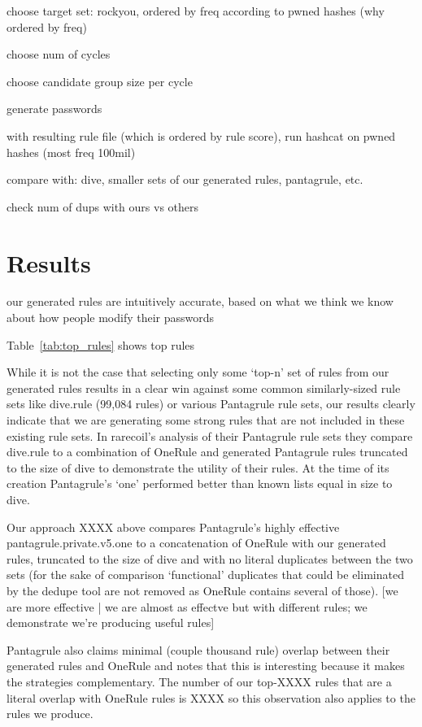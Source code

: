 \documentclass[letterpaper,twocolumn,10pt]{article}
\begin{document}
choose target set: rockyou, ordered by freq according to pwned hashes (why
ordered by freq)

choose num of cycles

choose candidate group size per cycle

generate passwords

with resulting rule file (which is ordered by rule score), run hashcat on pwned
hashes (most freq 100mil)

compare with: dive, smaller sets of our generated rules, pantagrule, etc.

check num of dups with ours vs others

\section{Results}

our generated rules are intuitively accurate, based on what we think we know
about how people modify their passwords

Table~\ref{tab:top_rules} shows top rules

While it is not the case that selecting only some `top-n' set of rules from our
generated rules results in a clear win against some common similarly-sized rule sets
like dive.rule (99,084 rules) or various Pantagrule rule sets, our results clearly
indicate that we are generating some strong rules that are not included in these
existing rule sets. In rarecoil's analysis of their Pantagrule rule sets they compare
dive.rule to a combination of OneRule and generated Pantagrule rules truncated to
the size of dive to demonstrate the utility of their rules. At the time of its
creation Pantagrule's `one' performed better than known lists equal in size to dive.

Our approach XXXX above compares Pantagrule's highly effective pantagrule.private.v5.one
to a concatenation of OneRule with our generated rules, truncated to the size of dive
and with no literal duplicates between the two sets (for the sake of comparison `functional'
duplicates that could be eliminated by the dedupe tool are not removed as OneRule contains
several of those).  [we are more effective | we are almost as effectve but with different rules;
we demonstrate we're producing useful rules]

Pantagrule also claims minimal (couple thousand rule) overlap between their generated rules and OneRule
and notes that this is interesting because it makes the strategies complementary. The number of our top-XXXX rules
that are a literal overlap with OneRule rules is XXXX so this observation also applies to the rules we produce.
\end{document}

